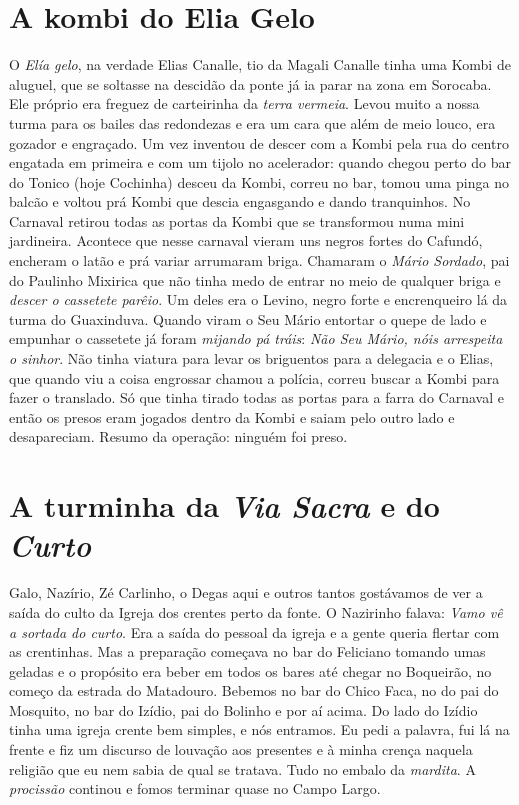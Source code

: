 \documentclass[12pt,brazil,]{book}
\begin{document}
\section{A kombi do Elia Gelo}\label{a-kombi-do-elia-gelo}

O \emph{Elía gelo}, na verdade Elias Canalle, tio da Magali Canalle
tinha uma Kombi de aluguel, que se soltasse na descidão da ponte já ia
parar na zona em Sorocaba. Ele próprio era freguez de carteirinha da
\emph{terra vermeia}. Levou muito a nossa turma para os bailes das
redondezas e era um cara que além de meio louco, era gozador e
engraçado. Um vez inventou de descer com a Kombi pela rua do centro
engatada em primeira e com um tijolo no acelerador: quando chegou perto
do bar do Tonico (hoje Cochinha) desceu da Kombi, correu no bar, tomou
uma pinga no balcão e voltou prá Kombi que descia engasgando e dando
tranquinhos. No Carnaval retirou todas as portas da Kombi que se
transformou numa mini jardineira. Acontece que nesse carnaval vieram uns
negros fortes do Cafundó, encheram o latão e prá variar arrumaram briga.
Chamaram o \emph{Mário Sordado}, pai do Paulinho Mixirica que não tinha
medo de entrar no meio de qualquer briga e \emph{descer o cassetete
parêio}. Um deles era o Levino, negro forte e encrenqueiro lá da turma
do Guaxinduva. Quando viram o Seu Mário entortar o quepe de lado e
empunhar o cassetete já foram \emph{mijando pá tráis}: \emph{Não Seu
Mário, nóis arrespeita o sinhor}. Não tinha viatura para levar os
briguentos para a delegacia e o Elias, que quando viu a coisa engrossar
chamou a polícia, correu buscar a Kombi para fazer o translado. Só que
tinha tirado todas as portas para a farra do Carnaval e então os presos
eram jogados dentro da Kombi e saiam pelo outro lado e desapareciam.
Resumo da operação: ninguém foi preso.

\section{\texorpdfstring{A turminha da \emph{Via Sacra} e do
\emph{Curto}}{A turminha da Via Sacra e do Curto}}\label{a-turminha-da-via-sacra-e-do-curto}

Galo, Nazírio, Zé Carlinho, o Degas aqui e outros tantos gostávamos de
ver a saída do culto da Igreja dos crentes perto da fonte. O Nazirinho
falava: \emph{Vamo vê a sortada do curto}. Era a saída do pessoal da
igreja e a gente queria flertar com as crentinhas. Mas a preparação
começava no bar do Feliciano tomando umas geladas e o propósito era
beber em todos os bares até chegar no Boqueirão, no começo da estrada do
Matadouro. Bebemos no bar do Chico Faca, no do pai do Mosquito, no bar
do Izídio, pai do Bolinho e por aí acima. Do lado do Izídio tinha uma
igreja crente bem simples, e nós entramos. Eu pedi a palavra, fui lá na
frente e fiz um discurso de louvação aos presentes e à minha crença
naquela religião que eu nem sabia de qual se tratava. Tudo no embalo da
\emph{mardita}. A \emph{procissão} continou e fomos terminar quase no
Campo Largo.
\end{document}
